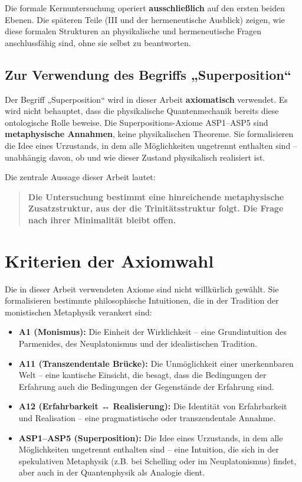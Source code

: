 \documentclass[
]{article}
\begin{document}
Die formale Kernuntersuchung operiert \textbf{ausschließlich} auf den ersten beiden Ebenen. Die späteren Teile (III und der hermeneutische Ausblick) zeigen, wie diese formalen Strukturen an physikalische und hermeneutische Fragen anschlussfähig sind, ohne sie selbst zu beantworten.

\subsection{Zur Verwendung des Begriffs „Superposition“}

Der Begriff „Superposition“ wird in dieser Arbeit \textbf{axiomatisch} verwendet. Es wird nicht behauptet, dass die physikalische Quantenmechanik bereits diese ontologische Rolle beweise. Die Superpositions-Axiome ASP1–ASP5 sind \textbf{metaphysische Annahmen}, keine physikalischen Theoreme. Sie formalisieren die Idee eines Urzustands, in dem alle Möglichkeiten ungetrennt enthalten sind – unabhängig davon, ob und wie dieser Zustand physikalisch realisiert ist.

Die zentrale Aussage dieser Arbeit lautet:

\begin{quote}
\textbf{Die Untersuchung bestimmt eine hinreichende metaphysische Zusatzstruktur, aus der die Trinitätsstruktur folgt. Die Frage nach ihrer Minimalität bleibt offen.}
\end{quote}

\section{Kriterien der Axiomwahl}

Die in dieser Arbeit verwendeten Axiome sind nicht willkürlich gewählt. Sie formalisieren bestimmte philosophische Intuitionen, die in der Tradition der monistischen Metaphysik verankert sind:

\begin{itemize}
\item \textbf{A1 (Monismus):} Die Einheit der Wirklichkeit – eine Grundintuition des Parmenides, des Neuplatonismus und der idealistischen Tradition.
\item \textbf{A11 (Transzendentale Brücke):} Die Unmöglichkeit einer unerkennbaren Welt – eine kantische Einsicht, die besagt, dass die Bedingungen der Erfahrung auch die Bedingungen der Gegenstände der Erfahrung sind.
\item \textbf{A12 (Erfahrbarkeit ↔ Realisierung):} Die Identität von Erfahrbarkeit und Realisation – eine pragmatistische oder transzendentale Annahme.
\item \textbf{ASP1–ASP5 (Superposition):} Die Idee eines Urzustands, in dem alle Möglichkeiten ungetrennt enthalten sind – eine Intuition, die sich in der spekulativen Metaphysik (z.B. bei Schelling oder im Neuplatonismus) findet, aber auch in der Quantenphysik als Analogie dient.
\end{itemize}
\end{document}
